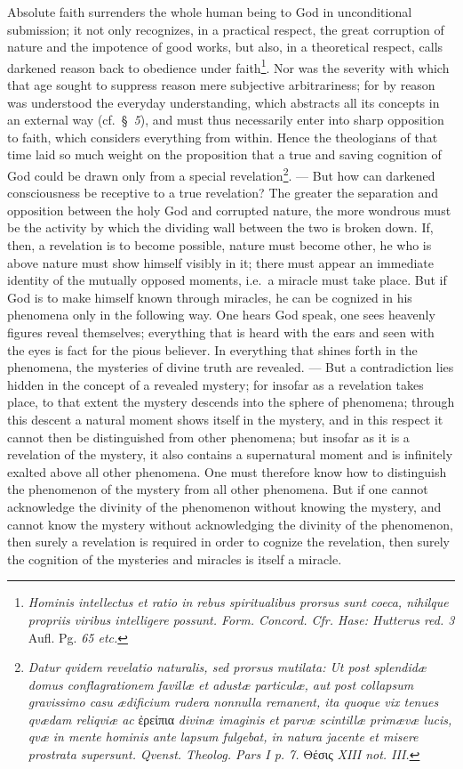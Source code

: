 \documentclass[12pt]{book}
\newcommand{\opage}[1]{\marginnote{\footnotesize\textit{[#1]}}}
\begin{document}
Absolute faith surrenders the whole human being to God in unconditional
submission; it not only recognizes, in a practical
\opage{75} \setcounter{footnote}{0}%
respect, the great corruption of nature and the impotence of good works, but
also, in a theoretical respect, calls darkened reason back to obedience
under faith\footnote{\textit{Hominis intellectus et ratio in rebus
spiritualibus prorsus sunt coeca, nihilque propriis viribus intelligere
possunt. Form. Concord. Cfr. Hase: Hutterus red. 3} Aufl. Pg. \textit{65
etc.}}. Nor was the severity with which that age sought to suppress reason
mere subjective arbitrariness; for by reason was understood the everyday
understanding, which abstracts all its concepts in an external way (cf.\
§~\textit{5}), and must thus necessarily enter into sharp opposition to
faith, which considers everything from within. Hence the theologians of that
time laid so much weight on the proposition that a true and saving cognition
of God could be drawn only from a special revelation\footnote{\textit{Datur
qvidem revelatio naturalis, sed prorsus mutilata: Ut post splendidæ domus
conflagrationem favillæ et adustæ particulæ, aut post collapsum gravissimo
casu ædificium rudera nonnulla remanent, ita quoque vix tenues qvædam
reliqviæ ac} ἐρείπια \textit{divinæ imaginis et parvæ scintillæ primævæ
lucis, qvæ in mente hominis ante lapsum fulgebat, in natura jacente et misere
prostrata supersunt. Qvenst. Theolog. Pars I p. 7.} Θέσις \textit{XIII not.
III.}}. --- But how can darkened consciousness be receptive to a true
revelation? The greater the separation and opposition between the holy God
and corrupted nature, the more wondrous must be the activity by which the
dividing wall between the two is broken down. If, then, a revelation is to
become possible, nature must become other, he who is above nature must show
himself visibly in it; there must appear an immediate identity of the
mutually opposed moments, i.e.\ a miracle must take place. But if God is to
make himself known through miracles, he can be cognized in his phenomena only
in the following way. One hears God speak, one
\opage{76} \setcounter{footnote}{0}%
sees heavenly figures reveal themselves; everything that is heard with the
ears and seen with the eyes is fact for the pious believer. In everything
that shines forth in the phenomena, the mysteries of divine truth are
revealed. --- But a contradiction lies hidden in the concept of a revealed
mystery; for insofar as a revelation takes place, to that extent the mystery
descends into the sphere of phenomena; through this descent a natural moment
shows itself in the mystery, and in this respect it cannot then be
distinguished from other phenomena; but insofar as it is a revelation of the
mystery, it also contains a supernatural moment and is infinitely exalted
above all other phenomena. One must therefore know how to distinguish the
phenomenon of the mystery from all other phenomena. But if one cannot
acknowledge the divinity of the phenomenon without knowing the mystery, and
cannot know the mystery without acknowledging the divinity of the phenomenon,
then surely a revelation is required in order to cognize the revelation, then
surely the cognition of the mysteries and miracles is itself a miracle.
\end{document}
